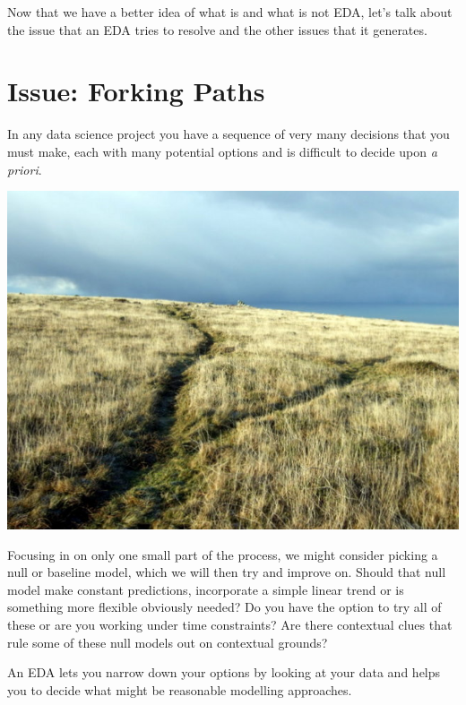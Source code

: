 \documentclass[
  12pt,
]{book}
\begin{document}
Now that we have a better idea of what is and what is not EDA, let's talk about the issue that an EDA tries to resolve and the other issues that it generates.

\hypertarget{issue-forking-paths}{%
\section{Issue: Forking Paths}\label{issue-forking-paths}}

In any data science project you have a sequence of very many decisions that you must make, each with many potential options and is difficult to decide upon \emph{a priori}.

\includegraphics{images/302-data-exploration/forking-paths.jpg}

Focusing in on only one small part of the process, we might consider picking a null or baseline model, which we will then try and improve on. Should that null model make constant predictions, incorporate a simple linear trend or is something more flexible obviously needed? Do you have the option to try all of these or are you working under time constraints? Are there contextual clues that rule some of these null models out on contextual grounds?

An EDA lets you narrow down your options by looking at your data and helps you to decide what might be reasonable modelling approaches.
\end{document}
